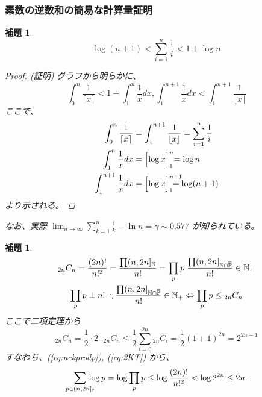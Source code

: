 \documentclass[12pt, a4j]{ltjsarticle}
\newtheorem{lem}[thm]{補題}
\begin{document}
\subsubsection{素数の逆数和の簡易な計算量証明}
\begin{lem}\label{lrm:klogo}
\begin{equation}
\log (n + 1)< \sum_{i=1}^n \frac{1}{i} < 1 + \log n
\end{equation}
\begin{proof}(証明) グラフから明らかに、
\begin{equation}
\int_{0}^{n} \frac{1}{\lceil x\rceil} < 1 + \int_{1}^{n} \frac{1}{x} dx, \int_{1}^{n+1} \frac{1}{x} dx < \int_{1}^{n+1} \frac{1}{\lfloor x\rfloor}
\end{equation} ここで、
\begin{align}
\int_{0}^{n} \frac{1}{\lceil x\rceil} &= \int_{1}^{n+1} \frac{1}{\lfloor x\rfloor} = \sum_{i=1}^n \frac{1}{i} \\
\int_{1}^{n} \frac{1}{x} dx &= \Bigl [ \log x \Bigr ]_1^n\hspace{-1mm} = \log n \\
\int_{1}^{n+1} \frac{1}{x} dx &= \Bigl [ \log x \Bigr ]_1^{n+1}\hspace{-5mm} = \log (n+1)
\end{align}
より示される。
\end{proof}
なお、実際 $\displaystyle\lim _{n\rightarrow\infty}\sum_{k=1}^n \frac{1}{k} - \ln n = \gamma \sim 0.577 $ が知られている。
\end{lem}

\vspace{1cm}

\begin{lem}\label{lem:logp2n}
  \begin{gather}
    {}_{2n}C_n = \frac{(2n)!}{n!^2} = \frac{\prod(n,2n]_\mathbb{N}}{n!}=\prod_pp\hspace{1mm}\frac{\prod(n,2n]_{\mathbb{N}\cap\overline{\mathbb{P}}}}{n!}\in \mathbb{N_+} \\
    \prod_pp \perp n! \therefore\frac{\prod(n,2n]_{\mathbb{N}\cap\overline{\mathbb{P}}}}{n!}\in\mathbb{N_+}\Leftrightarrow\prod_pp\le {}_{2n}C_n\label{eq:nckprodp}
  \end{gather}
ここで二項定理から
\begin{equation}
  {}_{2n}C_n=\frac{1}{2}\cdot2\cdot{}_{2n}C_n\le\frac{1}{2}\sum_{i=0}^{2n}{}_{2n}C_i=\frac{1}{2}(1+1)^{2n}=2^{2n-1} \label{eq:2KT}
\end{equation}
すなわち、\upshape (\ref{eq:nckprodp}), (\ref{eq:2KT}) から、
\begin{equation}
  \sum_{p \in (n,2n]_\mathbb{P}} \hspace{-3mm}\log p = \log \prod_p p \le \log \frac{(2n)!}{n!^2} < \log 2^{2n} \le 2n.
\end{equation}
\end{lem}
\end{document}
